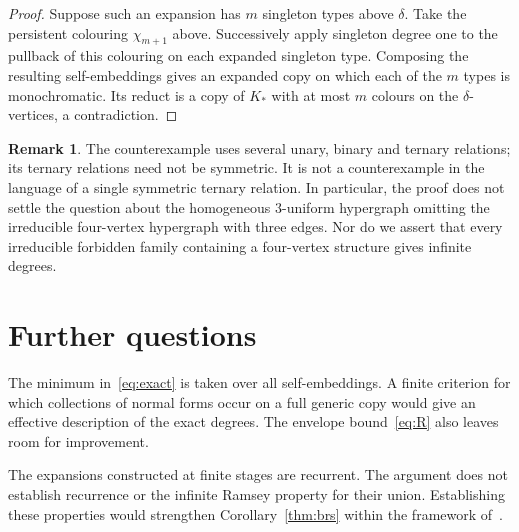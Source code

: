 \documentclass{article}
\numberwithin{equation}{section}
\theoremstyle{definition}
\newtheorem{remark}[theorem]{Remark}
\begin{document}
\begin{proof}
Suppose such an expansion has $m$ singleton types above $\delta$.
Take the persistent colouring $\chi_{m+1}$ above. Successively apply
singleton degree one to the pullback of this colouring on each expanded
singleton type. Composing the resulting self-embeddings gives an expanded
copy on which each of the $m$ types is monochromatic. Its reduct is a copy
of $K_*$ with at most $m$ colours on the $\delta$-vertices, a contradiction.
\end{proof}

\begin{remark}\label{neg:scope}
The counterexample uses several unary, binary and ternary relations; its
ternary relations need not be symmetric. It is not a counterexample in the language
of a single symmetric ternary relation. In particular, the proof does not
settle the question about the homogeneous $3$-uniform hypergraph omitting
the irreducible four-vertex hypergraph with three edges. Nor do we assert
that every irreducible forbidden family containing a four-vertex structure
gives infinite degrees.
\end{remark}
\section{Further questions}\label{sec:questions}

The minimum in~\eqref{eq:exact} is taken over all self-embeddings.
A finite criterion for which collections of normal forms occur on a full
generic copy would give an effective description of the exact degrees.
The envelope bound~\eqref{eq:R} also leaves room for improvement.

The expansions constructed at finite stages are recurrent. The argument
does not establish recurrence or the infinite Ramsey property for their
union. Establishing these properties would strengthen
Corollary~\ref{thm:brs} within the framework of~\cite{ZuckerDynamics,HZ}.
\end{document}

